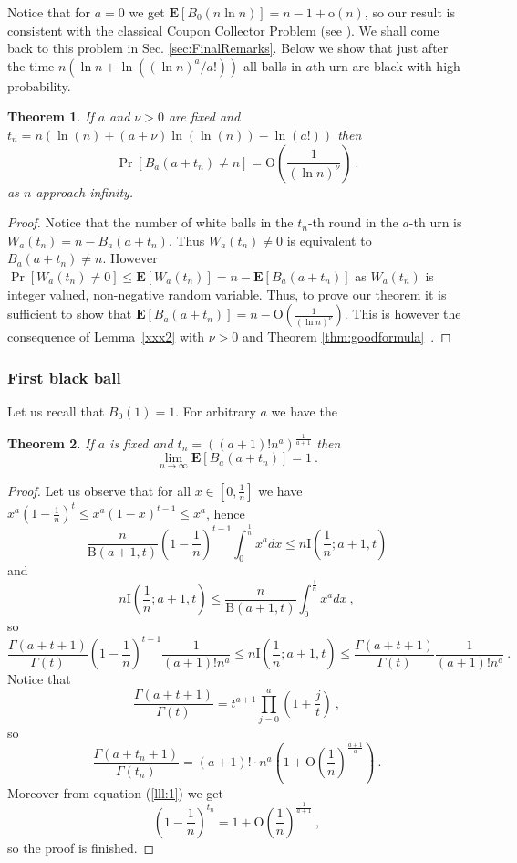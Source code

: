 \documentclass[submission]{dmtcs}
\newtheorem{theorem}{Theorem}
\newcommand{\E}[1]{\mathbf{E}\left[#1\right]}
\newcommand{\Beta}[2]{\mathrm{B}(#1,#2)}
\newcommand{\IBETAREGn}[2]{\mathrm{I}\left(\frac1n;#1,#2\right)}
\newcommand{\BigO}[1]{\mathrm{O}\left(#1\right)}
\newcommand{\SmallO}[1]{\mathrm{o}\left(#1\right)}
\newcommand{\Marek} [1]{\marginpar{\scriptsize {\bf MKlo}:#1}}
\begin{document}
Notice that for $a=0$ we get 
$\E{B_{0}(n\ln n)} = n-1 + \SmallO{n}$,
so our result is consistent with the classical Coupon Collector Problem 
(see \cite{Feller1}). We shall come back to this problem in 
Sec. \ref{sec:FinalRemarks}.
Below we show that just after the time 
$n(\ln n + \ln ((\ln n)^a/a!))$
all balls in $a$th urn are black with high probability.

\begin{theorem}\label{thm5xc}
If  $a$ and $\nu>0$ are fixed and $t_n = n(\ln(n) + (a+\nu) \ln(\ln(n)) - \ln(a!))$ then
$$
\Pr[B_{a}(a+t_n)\neq n] = \BigO{\frac{1}{(\ln n)^{\nu}}} ~.
$$
as $n$ approach infinity.
\end{theorem}

\begin{proof}
Notice that the number of white balls in the $t_n$-th round in the $a$-th urn is
$W_a(t_n)=n-B_{a}(a+t_n)$. Thus $W_a(t_n)\neq 0$ is equivalent to
$B_{a}(a+t_n)\neq n$. However $\Pr[W_a(t_n)\neq 0]\leq \E{W_a(t_n)} 
= n - \E{B_{a}(a+t_n)}$ as $W_a(t_n)$ is integer valued, non-negative random variable.  
Thus, to prove our theorem it is sufficient  
to show that $\E{B_{a}(a+t_n)} = n - \BigO{\frac{1}{(\ln n)^{\nu}}}$. 
This is however the consequence of Lemma~\ref{xxx2} with $\nu > 0$ and  
Theorem \ref{thm:goodformula}~.
\end{proof}
\Marek{Uwaga, zmienione oznaczenia !}


\subsubsection{First black ball}

Let us recall that $B_0(1) = 1$. For arbitrary $a$ we have the 

\begin{theorem}
\label{thm:first}
If $a$ is fixed and $t_n = ((a+1)! n^a)^{\frac{1}{a+1}}$ then
$$
\lim_{n\to\infty} \E{B_{a}(a+t_n)} = 1~.
$$
\end{theorem}

\begin{proof} 
Let us observe that for all $x \in [0,\frac{1}{n}]$ we have
$x^a (1-\frac{1}{n})^t \leq x^a(1-x)^{t-1} \leq x^a$, 
hence
$$
  \frac{n}{\Beta{a+1}{t}}(1-\frac{1}{n})^{t-1} \int_{0}^{\frac1n}x^a dx \leq
  n \IBETAREGn{a+1}{t}
$$
and
$$
  n \IBETAREGn{a+1}{t} \leq
  \frac{n}{\Beta{a+1}{t}} \int_{0}^{\frac1n}x^a dx ~,
$$
so
$$
\frac{\Gamma(a+t+1)}{\Gamma(t)} (1-\frac{1}{n})^{t-1} \frac{1}{(a+1)!n^a} \leq
n \IBETAREGn{a+1}{t} \leq
\frac{\Gamma(a+t+1)}{\Gamma(t)} \frac{1}{(a+1)!n^a} ~.
$$
Notice that
$$
\frac{\Gamma(a+t+1)}{\Gamma(t)} = t^{a+1} \prod_{j=0}^{a}(1+\frac{j}{t})~,
$$
so 
$$
 \frac{\Gamma(a+t_n+1)}{\Gamma(t_n)} = 
 (a+1)!\cdot n^{a}\left(1+ \BigO{\frac{1}{n}}^{\frac{a+1}{a}}\right)~.
$$
Moreover from equation (\ref{lll:1}) we get
$$
\left(1-\frac1n\right)^{t_n}  = 1 + \BigO{\frac1n}^{\frac{1}{a+1}}~,
$$
so the proof is finished.
\end{proof}
\end{document}
